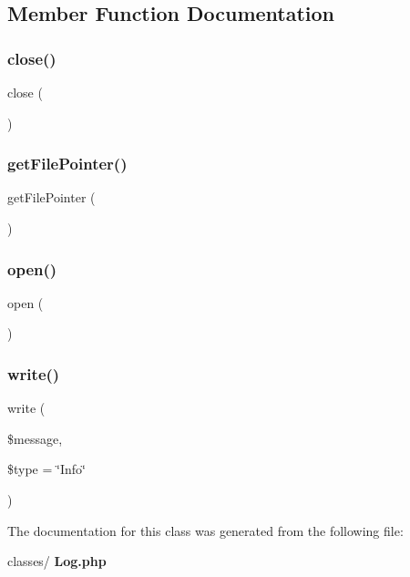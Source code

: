 \subsection{Member Function Documentation}
\mbox{\label{class_log_aa69c8bf1f1dcf4e72552efff1fe3e87e}} 
\subsubsection{close()}
{\footnotesize\ttfamily close (\begin{DoxyParamCaption}{ }\end{DoxyParamCaption})}

\mbox{\label{class_log_a920308bfd90102618703af4393ccab7c}} 
\subsubsection{get\+File\+Pointer()}
{\footnotesize\ttfamily get\+File\+Pointer (\begin{DoxyParamCaption}{ }\end{DoxyParamCaption})}

\mbox{\label{class_log_a44a2ac59a3b91f8c18905dce700934d6}} 
\subsubsection{open()}
{\footnotesize\ttfamily open (\begin{DoxyParamCaption}{ }\end{DoxyParamCaption})}

\mbox{\label{class_log_a1176b92f0b0e4b3a40514af0dbc55169}} 
\subsubsection{write()}
{\footnotesize\ttfamily write (\begin{DoxyParamCaption}\item[{}]{\$message,  }\item[{}]{\$type = {\ttfamily \char`\"{}Info\char`\"{}} }\end{DoxyParamCaption})}



The documentation for this class was generated from the following file\+:\begin{DoxyCompactItemize}
\item 
classes/\textbf{ Log.\+php}\end{DoxyCompactItemize}
